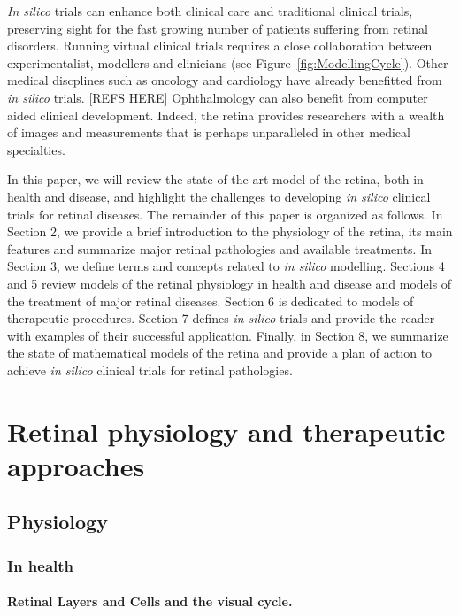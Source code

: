 \documentclass{article}
\begin{document}
\textit{In silico} trials can enhance both clinical care and traditional clinical trials, preserving sight for the fast growing number of patients suffering from retinal disorders.
Running virtual clinical trials requires a close collaboration between experimentalist, modellers and clinicians (see Figure~\ref{fig:ModellingCycle}).
Other medical discplines such as oncology and cardiology have already benefitted from \textit{in silico} trials. [REFS HERE]
Ophthalmology can also benefit from computer aided clinical development.
Indeed, the retina provides researchers with a wealth of images and measurements that is perhaps unparalleled in other medical specialties.

In this paper, we will review the state-of-the-art model of the retina, both in health and disease, and highlight the challenges to developing \textit{in silico} clinical trials for retinal diseases.
The remainder of this paper is organized as follows.
In Section 2, we provide a brief introduction to the physiology of the retina, its main features and summarize major retinal pathologies and available treatments.
In Section 3, we define terms and concepts related to \textit{in silico} modelling.
Sections 4 and 5 review models of the retinal physiology in health and disease and models of the treatment of major retinal diseases.
Section 6 is dedicated to models of therapeutic procedures.
Section 7 defines \textit{in silico} trials and provide the reader with examples of their successful application.
Finally, in Section 8, we summarize the state of mathematical models of the retina and provide a plan of action to achieve \textit{in silico} clinical trials for retinal pathologies.


\section*{Retinal physiology and therapeutic approaches}

\subsection*{Physiology}

\subsubsection*{In health}

\paragraph*{Retinal Layers and Cells and the visual cycle.}
\end{document}
